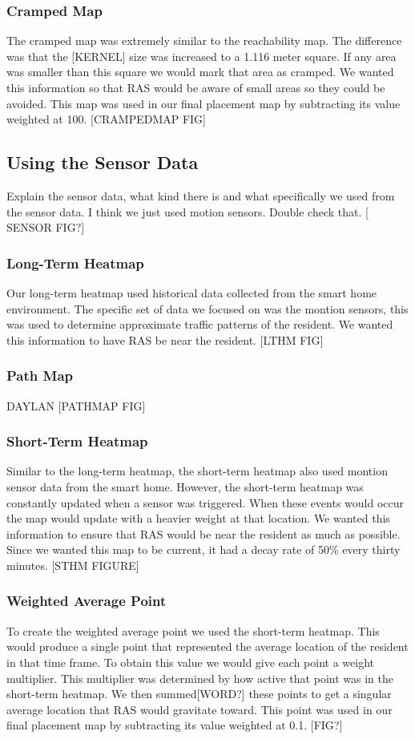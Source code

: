 \documentclass[11pt, draft, a4paper]{IEEEtran}
\begin{document}
\subsubsection{Cramped Map}
The cramped map was extremely similar to the reachability map. The difference 
was that the [KERNEL] size was increased to a 1.116 meter square. If any area 
was smaller than this square we would mark that area as cramped. We wanted 
this information so that RAS would be aware of small areas so they could be 
avoided. This map was used in our final placement map by subtracting its value 
weighted at 100. [CRAMPEDMAP FIG]


\subsection{Using the Sensor Data}
Explain the sensor data, what kind there is and what specifically we used from 
the sensor data. I think we just used motion sensors. Double check that. [
SENSOR FIG?]


\subsubsection{Long-Term Heatmap}
Our long-term heatmap used historical data collected from the smart home 
environment. The specific set of data we focused on was the montion sensors, 
this was used to determine approximate traffic patterns of the resident. We 
wanted this information to have RAS be near the resident. [LTHM FIG]


\subsubsection{Path Map}
DAYLAN
[PATHMAP FIG]


\subsubsection{Short-Term Heatmap}
Similar to the long-term heatmap, the short-term heatmap also used montion 
sensor data from the smart home. However, the short-term heatmap was 
constantly updated when a sensor was triggered. When these events would occur 
the map would update with a heavier weight at that location. We wanted this 
information to ensure that RAS would be near the resident as much as possible. 
Since we wanted this map to be current, it had a decay rate of 50\% every 
thirty minutes. [STHM FIGURE]


\subsubsection{Weighted Average Point}
To create the weighted average point we used the short-term heatmap. This 
would produce a single point that represented the average location of the 
resident in that time frame. To obtain this value we would give each point a 
weight multiplier. This multiplier was determined by how active that point was 
in the short-term heatmap. We then summed[WORD?] these points to get a 
singular average location that RAS would gravitate toward. This point was used 
in our final placement map by subtracting its value weighted at 0.1. [FIG?]
\end{document}
